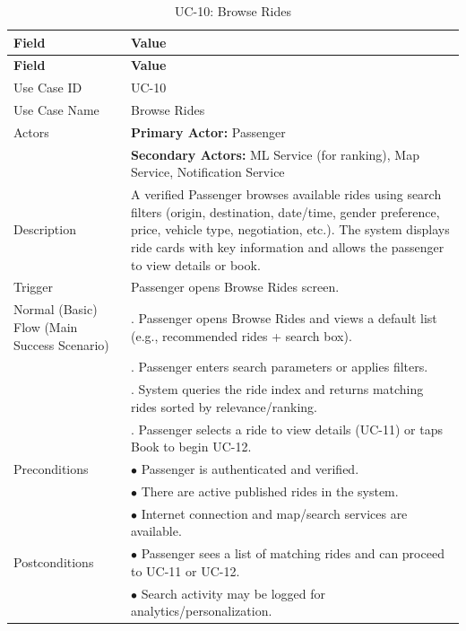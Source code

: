 \begin{longtable}{|>{\raggedright\arraybackslash}p{4cm}|>{\raggedright\arraybackslash}p{11cm}|}
\caption{UC-10: Browse Rides}
\label{tab:uc-10} \\
\hline
\rowcolor{lightgray!30}
\textbf{Field} & \textbf{Value} \\
\hline
\endfirsthead
\hline
\rowcolor{lightgray!30}
\textbf{Field} & \textbf{Value} \\
\hline
\endhead
\hline
\endfoot
\hline
\endlastfoot
Use Case ID & UC-10 \\
\hline
Use Case Name & Browse Rides \\
\hline
Actors & \textbf{Primary Actor:} Passenger \\
& \textbf{Secondary Actors:} ML Service (for ranking), Map Service, Notification Service \\
\hline
Description & A verified Passenger browses available rides using search filters (origin, destination, date/time, gender preference, price, vehicle type, negotiation, etc.). The system displays ride cards with key information and allows the passenger to view details or book. \\
\hline
Trigger & Passenger opens Browse Rides screen. \\
\hline
Normal (Basic) Flow (Main Success Scenario) & 1. Passenger opens Browse Rides and views a default list (e.g., recommended rides + search box). \\
& 2. Passenger enters search parameters or applies filters. \\
& 3. System queries the ride index and returns matching rides sorted by relevance/ranking. \\
& 4. Passenger selects a ride to view details (UC-11) or taps Book to begin UC-12. \\
\hline
Preconditions & $\bullet$ Passenger is authenticated and verified. \\
& $\bullet$ There are active published rides in the system. \\
& $\bullet$ Internet connection and map/search services are available. \\
\hline
Postconditions & $\bullet$ Passenger sees a list of matching rides and can proceed to UC-11 or UC-12. \\
& $\bullet$ Search activity may be logged for analytics/personalization. \\

\end{longtable}
